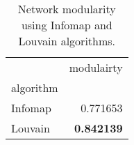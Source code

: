 \begin{table}[!htbp]
\centering
\caption{Network modularity using Infomap and Louvain algorithms.}
\label{tab:modularity}
\begin{tabular}{lr}
\toprule
 & modulairty \\
algorithm &  \\
\midrule
Infomap & 0.771653 \\
Louvain & \textbf{0.842139} \\
\bottomrule
\end{tabular}
\end{table}
